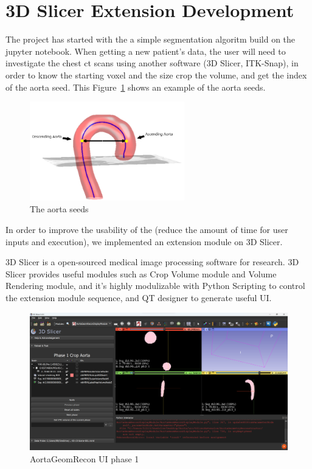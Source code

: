 \section{3D Slicer Extension Development}
The project has started with the a simple segmentation algoritm build on the jupyter notebook. When getting a new patient's data, the user will need to investigate the chest ct scans using another software (3D Slicer, ITK-Snap), in order to know the starting voxel and the size crop the volume, and get the index of the aorta seed. This Figure~\ref{fig_aorta_seed} shows an example of the aorta seeds.

\begin{figure}[ht]
    \centering
    \includegraphics[width=0.6\textwidth]{figures/Sample/Aorta_seeds.png}
    \caption[Single Figure Environment Listed Title]{The aorta seeds \citep{6346433}}
    \label{fig_aorta_seed}
\end{figure}

In order to improve the usability of the \progname{} (reduce the amount of time for user inputs and execution), we implemented an extension module on 3D Slicer. 

3D Slicer is a open-sourced medical image processing software for research. 3D Slicer provides useful modules such as Crop Volume module and Volume Rendering module, and it's highly modulizable with Python Scripting to control the extension module sequence, and QT designer to generate useful UI.

\begin{figure}[H]
    \centering
    \includegraphics[width=\textwidth]{figures/Sample/SlicerUI.png}
    \caption[Single Figure Environment Listed Title]{AortaGeomRecon UI phase 1}
    \label{fig_UI_1}
\end{figure}

